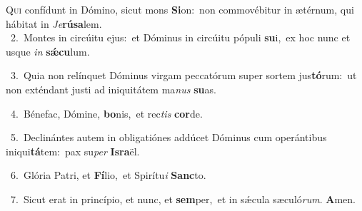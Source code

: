 \lettrine{\initial\textcolor{\initialcolor}{Q}}{ui} confídunt in Dómino, sicut mons \textbf{Si}\-on:~\star non commovébitur in ætérnum, qui hábitat in \textit{Je}\-\textbf{rú}\textbf{sa}lem.\\
{\numbfont\textcolor{\numbcolor}{~2.}}~Montes in circúitu ejus:~\dagger et Dóminus in circúitu pópuli \textbf{su}\-i,~\star ex hoc nunc et usque \textit{in} \textbf{sǽ}\-\textbf{cu}lum.\par
{\numbfont\textcolor{\numbcolor}{~3.}}~Quia non relínquet Dóminus virgam peccatórum super sortem jus\-\textbf{tó}\-rum:~\star ut non exténdant justi ad iniquitátem ma\textit{nus} \textbf{su}\-as.\par
{\numbfont\textcolor{\numbcolor}{~4.}}~Bénefac, Dómine, \textbf{bo}\-nis,~\star et rec\textit{tis} \textbf{cor}\-de.\par
{\numbfont\textcolor{\numbcolor}{~5.}}~Declinántes autem in obligatiónes addúcet Dóminus cum operántibus iniqui\-\textbf{tá}\-tem:~\star pax su\textit{per} \textbf{Is}\-\textbf{ra}ël.\par
{\numbfont\textcolor{\numbcolor}{~6.}}~Glória Patri, et \textbf{Fí}\-lio,~\star et Spirítu\textit{i} \textbf{Sanc}\-to.\par
{\numbfont\textcolor{\numbcolor}{~7.}}~Sicut erat in princípio, et nunc, et \textbf{sem}\-per,~\star et in sǽcula sæculó\-\textit{rum}\-. \textbf{A}\-men.\par
